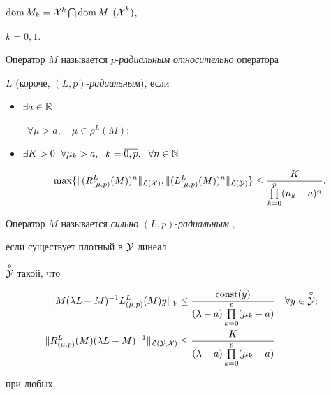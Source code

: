 $\operatorname{dom} M_k={\cal X}^k \bigcap \operatorname{dom} M$ ${\cal(X}^k)$,


$k=0,1$.





Оператор $M$ называется $p$-{\it радиальным} {\it относительно} оператора


$L$ (короче, $(L,p)$-{\it ра\-ди\-аль\-ным}), если


\begin{itemize}


\item[(i)] $\exists a \in {\Bbb R}$


$\ \; \forall \mu>a$, \ \; $\mu\in\rho^L(M);$


\item[(ii)] $\exists K>0 \ \; \forall \mu_k>a,\ \;


k=\overline{0,p}, \ \; \forall n\in{\Bbb N}$


$$


\max \{\|(R^L_{(\mu,p)}(M))^n\|_{{\cal L(\cal X)}},


\|(L^L_{(\mu,p)}(M))^n\|_{{\cal L(\cal Y)}}\}


\le\frac{K}{\prod\limits^p_{k=0}(\mu_k-a)^n}.


$$


\end{itemize}





Оператор $M$ называется {\it сильно} $(L,p)$-{\it радиальным} ,


если существует плотный в ${\cal Y}$ линеал


$\overset{\circ}{{\cal Y}}$ такой, что


\begin{align*}


\|M(\lambda


L-M)^{-1}L^L_{(\mu,p)}(M)y\| _{{\cal Y}}& \le\frac{\const


(y)}{(\lambda-a)\prod\limits^p_{k=0}(\mu_k-a)} \quad \forall y\in


\overset{\circ}{{\cal Y}};\\


%


\|R^L_{(\mu,p)}(M)(\lambda L-M)^{-1}\| _{{\cal


L(\cal Y;\cal X)}}& \le\frac{K}{(\lambda-a)\prod\limits^p_{k=0}(\mu_k-a)}


\end{align*}


при любых



